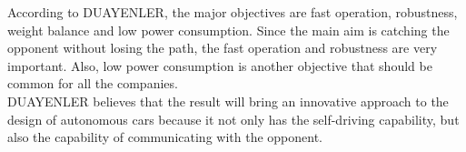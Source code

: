 \documentclass[a4paper,12pt]{article}
\begin{document}
According to DUAYENLER, the major objectives are fast operation, robustness, weight balance and low power consumption. Since the main aim is catching the opponent without losing the path, the fast operation and robustness are very important. Also, low power consumption is another objective that should be common for all the companies.\\

DUAYENLER believes that the result will bring an innovative approach to the design of autonomous cars because it not only has the self-driving capability, but also the capability of communicating with the opponent.

\newpage
\begin{appendices}
	
		
		

	
\end{appendices}
\end{document}
